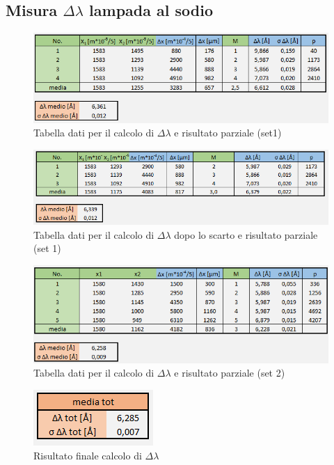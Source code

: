 \documentclass{article}
\begin{document}
\subsection{Misura $\Delta\lambda$ lampada al sodio}

\begin{figure}[h!]
  \centering
  \includegraphics[width=0.75\linewidth]{IM tabella delta lambda set 1}
  \caption{Tabella dati per il calcolo di $\Delta\lambda$ e risultato parziale (set1)}
\end{figure}

\begin{figure}[h!]
  \centering
  \includegraphics[width=0.75\linewidth]{IM tabella delta lambda set 1 scarto}
  \caption{Tabella dati per il calcolo di $\Delta\lambda$ dopo lo scarto e risultato parziale (set 1)}
\end{figure}

\begin{figure}[h!]
  \centering
  \includegraphics[width=0.75\linewidth]{IM tabella delta lambda set 2}
  \caption{Tabella dati per il calcolo di $\Delta\lambda$ e risultato parziale (set 2)}
\end{figure}

\begin{figure}[h!]
  \centering
  \includegraphics[width=0.25\linewidth]{IM risultati delta lambda}
  \caption{Risultato finale calcolo di $\Delta\lambda$}
\end{figure}
\end{document}

